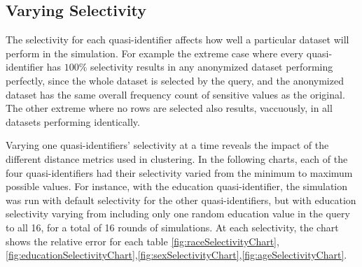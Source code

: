 \subsection{Varying Selectivity}
The selectivity for each quasi-identifier affects how well a particular dataset will perform in the simulation. For example the extreme case where every quasi-identifier has $100\%$ selectivity results in any anonymized dataset performing perfectly, since the whole dataset is selected by the query, and the anonymized dataset has the same overall frequency count of sensitive values as the original. The other extreme where no rows are selected also results, vaccuously, in all datasets performing identically.

Varying one quasi-identifiers' selectivity at a time reveals the impact of the different distance metrics used in clustering. In the following charts, each of the four quasi-identifiers had their selectivity varied from the minimum to maximum possible values. For instance, with the education quasi-identifier, the simulation was run with default selectivity for the other quasi-identifiers, but with education selectivity varying from including only one random education value in the query to all 16, for a total of 16 rounds of simulations. At each selectivity, the chart shows the relative error for each table \ref{fig:raceSelectivityChart},\ref{fig:educationSelectivityChart},\ref{fig:sexSelectivityChart},\ref{fig:ageSelectivityChart}.

\begin{figure*}
  \centering
  
  \caption{RaceTable Relative Error by Selectivity.\\At each selectivity, one simulation with 1000 queries of the form in figure \ref{fig:queryFormat} are run over each table.}
  \label{fig:raceSelectivityChart}
\end{figure*}
\begin{figure*}
  \centering
  
  \caption{EducationTable Relative Error by Selectivity.\\At each selectivity, one simulation with 1000 queries of the form in figure \ref{fig:queryFormat} are run over each table.}
  \label{fig:educationSelectivityChart}
\end{figure*}
\begin{figure*}
  \centering
  
  \caption{SexTable Relative Error by Selectivity.\\At each selectivity, one simulation with 1000 queries of the form in figure \ref{fig:queryFormat} are run over each table.}
  \label{fig:sexSelectivityChart}
\end{figure*}
\begin{figure*}
  \centering
  
  \caption{AgeTable Relative Error by Selectivity.\\At each selectivity, one simulation with 1000 queries of the form in figure \ref{fig:queryFormat} are run over each table.}
  \label{fig:ageSelectivityChart}
\end{figure*}

